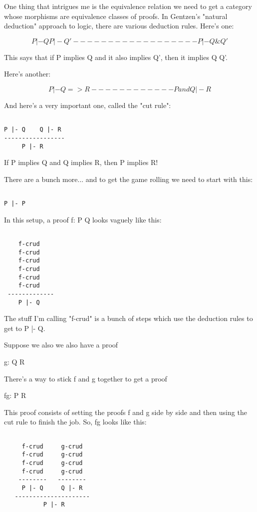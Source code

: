 One thing that intrigues me is the equivalence relation we need to get 
a category whose morphisms are equivalence classes of proofs.  In 
Gentzen's "natural deduction" approach to logic, there are various 
deduction rules.  Here's one: 


$$

P |- Q    P |- Q'
------------------
  P |- Q \text{\&}  Q'
$$
    

This says that if P implies Q and it also implies Q', then it 
implies Q \text{\&}  Q'.   

Here's another:


$$

P |- Q => R
------------
P and Q |- R
$$
    
And here's a very important one, called the "cut rule":


\begin{verbatim}

P |- Q    Q |- R
-----------------
     P |- R
\end{verbatim}
    
If P implies Q and Q implies R, then P implies R!

There are a bunch more... and to get the game rolling we need
to start with this:


\begin{verbatim}

P |- P
\end{verbatim}
    
In this setup, a proof f: P \to  Q looks vaguely like this:


\begin{verbatim}

    f-crud
    f-crud
    f-crud
    f-crud
    f-crud
    f-crud
 -------------
    P |- Q 
\end{verbatim}
    
The stuff I'm calling "f-crud" is a bunch of steps which use the
deduction rules to get to P |- Q.  

Suppose we also we also have a proof

g: Q \to  R

There's a way to stick f and g together to get a proof

fg: P \to  R

This proof consists of setting the proofs f and g side by side and then
using the cut rule to finish the job.  So, fg looks like this:


\begin{verbatim}

     f-crud     g-crud
     f-crud     g-crud
     f-crud     g-crud
     f-crud     g-crud
    --------   --------
     P |- Q     Q |- R
   ---------------------
           P |- R 
\end{verbatim}
    

